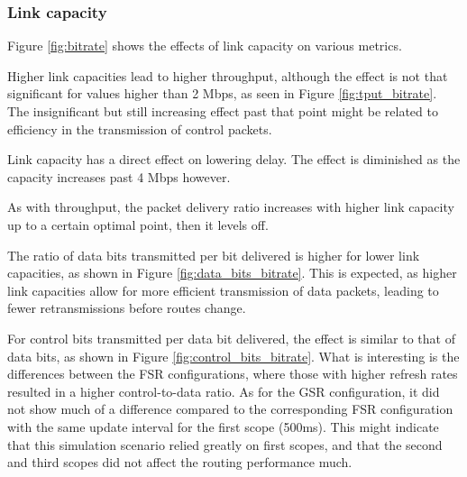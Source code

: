 \documentclass{winslabreport}
\begin{document}
\subsubsection{Link capacity}
Figure \ref{fig:bitrate} shows the effects of link capacity on various metrics.

Higher link capacities lead to higher throughput, although the effect is not that significant for values higher than 2 Mbps, as seen in Figure \ref{fig:tput_bitrate}. The insignificant but still increasing effect past that point might be related to efficiency in the transmission of control packets.

Link capacity has a direct effect on lowering delay. The effect is diminished as the capacity increases past 4 Mbps however.

As with throughput, the packet delivery ratio increases with higher link capacity up to a certain optimal point, then it levels off.

The ratio of data bits transmitted per bit delivered is higher for lower link capacities, as shown in Figure \ref{fig:data_bits_bitrate}. This is expected, as higher link capacities allow for more efficient transmission of data packets, leading to fewer retransmissions before routes change.

For control bits transmitted per data bit delivered, the effect is similar to that of data bits, as shown in Figure \ref{fig:control_bits_bitrate}. What is interesting is the differences between the FSR configurations, where those with higher refresh rates resulted in a higher control-to-data ratio. As for the GSR configuration, it did not show much of a difference compared to the corresponding FSR configuration with the same update interval for the first scope (500ms). This might indicate that this simulation scenario relied greatly on first scopes, and that the second and third scopes did not affect the routing performance much.
\end{document}

